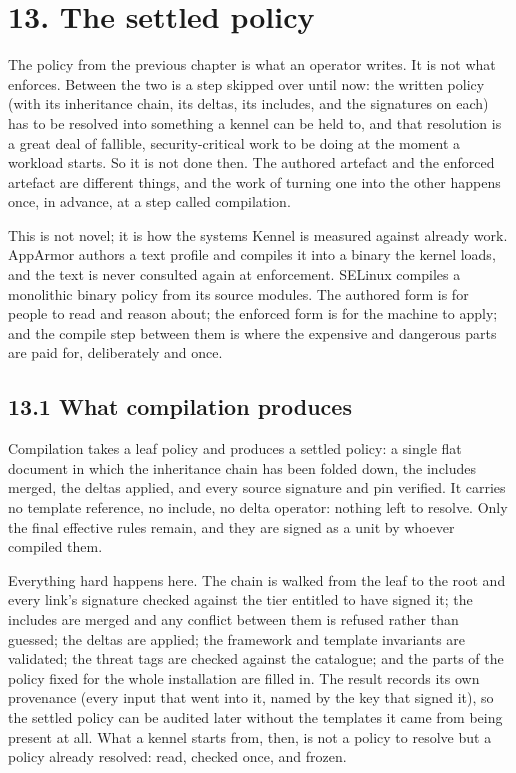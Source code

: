 \hypertarget{the-settled-policy}{%
\chapter{13. The settled policy}\label{the-settled-policy}}

The policy from the previous chapter is what an operator writes. It is
not what enforces. Between the two is a step skipped over until now: the
written policy (with its inheritance chain, its deltas, its includes,
and the signatures on each) has to be resolved into something a kennel
can be held to, and that resolution is a great deal of fallible,
security-critical work to be doing at the moment a workload starts. So
it is not done then. The authored artefact and the enforced artefact are
different things, and the work of turning one into the other happens
once, in advance, at a step called compilation.

This is not novel; it is how the systems Kennel is measured against
already work. AppArmor authors a text profile and compiles it into a
binary the kernel loads, and the text is never consulted again at
enforcement. SELinux compiles a monolithic binary policy from its source
modules. The authored form is for people to read and reason about; the
enforced form is for the machine to apply; and the compile step between
them is where the expensive and dangerous parts are paid for,
deliberately and once.

\hypertarget{what-compilation-produces}{%
\section{13.1 What compilation
produces}\label{what-compilation-produces}}

Compilation takes a leaf policy and produces a settled policy: a single
flat document in which the inheritance chain has been folded down, the
includes merged, the deltas applied, and every source signature and pin
verified. It carries no template reference, no include, no delta
operator: nothing left to resolve. Only the final effective rules
remain, and they are signed as a unit by whoever compiled them.

Everything hard happens here. The chain is walked from the leaf to the
root and every link's signature checked against the tier entitled to
have signed it; the includes are merged and any conflict between them is
refused rather than guessed; the deltas are applied; the framework and
template invariants are validated; the threat tags are checked against
the catalogue; and the parts of the policy fixed for the whole
installation are filled in. The result records its own provenance (every
input that went into it, named by the key that signed it), so the
settled policy can be audited later without the templates it came from
being present at all. What a kennel starts from, then, is not a policy
to resolve but a policy already resolved: read, checked once, and
frozen.

